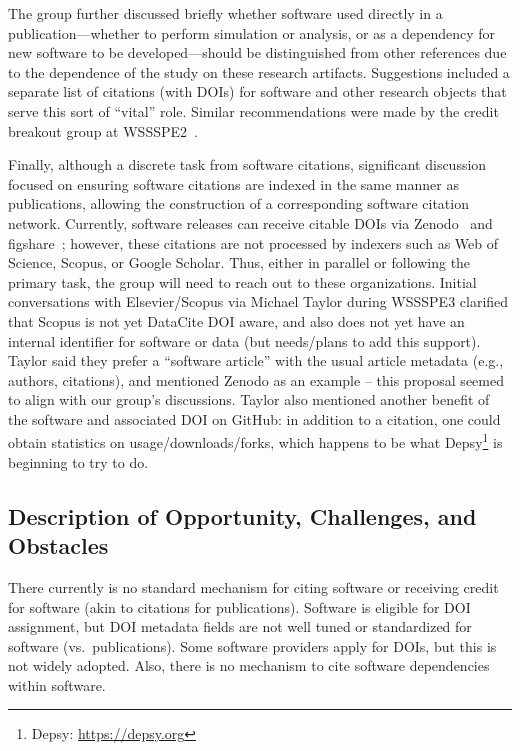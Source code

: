 The group further discussed briefly whether software used directly in a
publication---whether to perform simulation or analysis, or as a dependency for
new software to be developed---should be distinguished from other references due to
the dependence of the study on these research artifacts. Suggestions included a
separate list of citations (with DOIs) for software and other research objects
that serve this sort of ``vital'' role. Similar recommendations were made by the
credit breakout group at WSSSPE2~\cite{WSSSPE2}.

Finally, although a discrete task from software citations,
significant discussion focused on ensuring software citations are indexed in the
same manner as publications, allowing the construction of a corresponding
software citation network. Currently, software releases can receive citable DOIs
via Zenodo~\cite{zenodo-web} and figshare~\cite{figshare-web}; however, these
citations are not processed by indexers such as Web of Science, Scopus, or
Google Scholar. Thus, either in parallel or following the primary task, the
group will need to reach out to these organizations. Initial conversations with
Elsevier\slash Scopus via Michael Taylor during WSSSPE3 clarified that Scopus
is not yet DataCite DOI aware, and also does not yet have an internal identifier
for software or data (but needs\slash plans to add this support). Taylor said
they prefer a ``software article'' with the usual article metadata (e.g.,
authors, citations), and mentioned Zenodo as an example -- this proposal seemed
to align with our group's discussions. Taylor also mentioned another benefit of the
software and associated DOI on GitHub: in addition to a citation, one could obtain
statistics on usage/downloads/forks, which happens to be what
Depsy\footnote{Depsy: \url{https://depsy.org}} is beginning to try to do.

\subsection{Description of Opportunity, Challenges, and Obstacles}

There currently is no standard mechanism for citing software or
receiving credit for software (akin to citations for publications). Software is
eligible for DOI assignment, but DOI metadata fields are not well tuned or
standardized for software (vs.\ publications). Some software providers apply for
DOIs, but this is not widely adopted. Also, there is no mechanism to cite
software dependencies within software.

